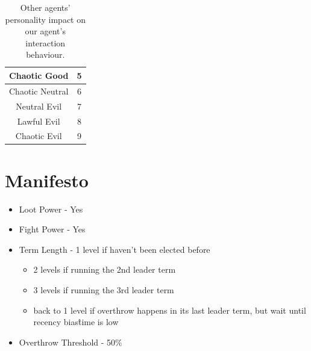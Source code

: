 \begin{table}[htb]
\begin{tabular}{ |c|p{16em}|p{16em}| }
        \hline
        Chaotic Good                      & \multicolumn{2}{c|}{5}                                                                                                                                                                                                                \\
        \hline
        Chaotic Neutral                   & \multicolumn{2}{c|}{6}                                                                                                                                                                                                                \\
        \hline
        Neutral Evil                      & \multicolumn{2}{c|}{7}                                                                                                                                                                                                                \\
        \hline
        Lawful Evil                       & \multicolumn{2}{c|}{8}                                                                                                                                                                                                                \\
        \hline
        Chaotic Evil                      & \multicolumn{2}{c|}{9}                                                                                                                                                                                                                \\
        \hline
    \end{tabular}
    \caption{Other agents' personality impact on our agent's interaction behaviour.}
    \label{table:personality_impact}
\end{table}

\section{Manifesto}
\begin{itemize}
    \item Loot Power - Yes
    \item Fight Power - Yes
    \item Term Length -  1 level if haven't been elected before
        \begin{itemize}
            \item 2 levels if running the 2nd leader term
            \item 3 levels if running the 3rd leader term
            \item back to 1 level if overthrow happens in its last leader term, but wait until recency bias\^time is low 
        \end{itemize}
    \item Overthrow Threshold - 50\%
\end{itemize}

